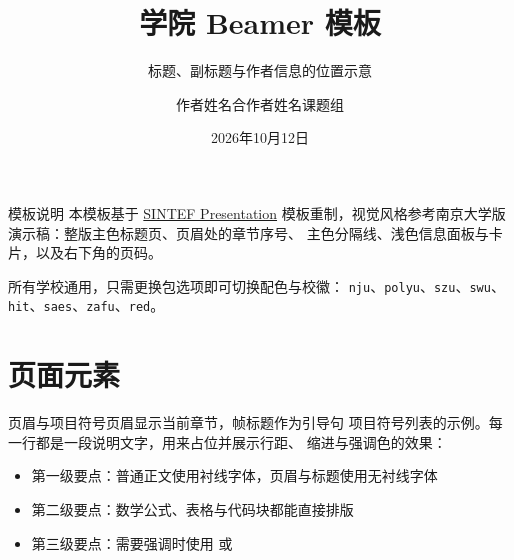 \documentclass{beamer}
\title{学院 Beamer 模板}
\subtitle{标题、副标题与作者信息的位置示意}
\author{作者姓名\quad 合作者姓名\quad 课题组}
\date{2026年10月12日}
\begin{document}
\maketitle

\begin{frame}{模板说明}
    本模板基于 \href{https://www.overleaf.com/latex/templates/sintef-presentation/jhbhdffczpnx}{SINTEF Presentation}
    模板重制，视觉风格参考南京大学版演示稿：整版主色标题页、页眉处的章节序号、
    主色分隔线、浅色信息面板与卡片，以及右下角的页码。

    \vspace{0.3cm}
    所有学校通用，只需更换包选项即可切换配色与校徽：
    \texttt{nju}、\texttt{polyu}、\texttt{szu}、\texttt{swu}、\texttt{hit}、\texttt{saes}、\texttt{zafu}、\texttt{red}。
\end{frame}

\section{页面元素}

\begin{frame}{页眉与项目符号}{页眉显示当前章节，帧标题作为引导句}
    项目符号列表的示例。每一行都是一段说明文字，用来占位并展示行距、
    缩进与强调色的效果：

    \begin{itemize}
        \item 第一级要点：普通正文使用衬线字体，页眉与标题使用无衬线字体
        \item 第二级要点：数学公式、表格与代码块都能直接排版
        \item 第三级要点：需要强调时使用  或 
    \end{itemize}

    \vspace{0.35cm}
\end{frame}
\end{document}
